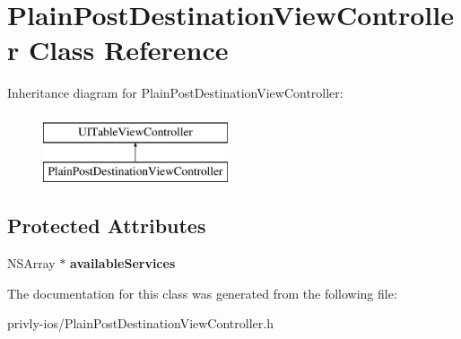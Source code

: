 \hypertarget{interface_plain_post_destination_view_controller}{\section{Plain\-Post\-Destination\-View\-Controller Class Reference}
\label{interface_plain_post_destination_view_controller}
}
Inheritance diagram for Plain\-Post\-Destination\-View\-Controller\-:\begin{figure}[H]
\begin{center}
\leavevmode
\includegraphics[height=2.000000cm]{interface_plain_post_destination_view_controller}
\end{center}
\end{figure}
\subsection*{Protected Attributes}
\begin{DoxyCompactItemize}
\item 
\hypertarget{interface_plain_post_destination_view_controller_a5933519d4d9ac6a4618a090a0ffba1b6}{N\-S\-Array $\ast$ {\bfseries available\-Services}}\label{interface_plain_post_destination_view_controller_a5933519d4d9ac6a4618a090a0ffba1b6}

\end{DoxyCompactItemize}


The documentation for this class was generated from the following file\-:\begin{DoxyCompactItemize}
\item 
privly-\/ios/Plain\-Post\-Destination\-View\-Controller.\-h\end{DoxyCompactItemize}
